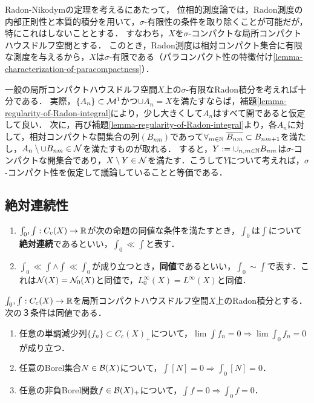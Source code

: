 \documentclass[uplatex,dvipdfmx]{jsreport}
\begin{document}
\begin{tcolorbox}[colframe=ForestGreen, colback=ForestGreen!10!white,breakable,colbacktitle=ForestGreen!40!white,coltitle=black,fonttitle=\bfseries\sffamily,
title=]
    Radon-Nikodymの定理を考えるにあたって，
    位相的測度論では，Radon測度の内部正則性と本質的積分を用いて，$\sigma$-有限性の条件を取り除くことが可能だが，特にこれはしないこととする．
    すなわち，$X$を$\sigma$-コンパクトな局所コンパクトハウスドルフ空間とする．
    このとき，Radon測度は相対コンパクト集合に有限な測度を与えるから，$X$は$\sigma$-有限である（パラコンパクト性の特徴付け\ref{lemma-characterization-of-paracompactness}）．
\end{tcolorbox}

\begin{remark}
    一般の局所コンパクトハウスドルフ空間$X$上の$\sigma$-有限なRadon積分を考えれば十分である．
    実際，$\{A_n\}\subset\mathcal{M}^1$かつ$\cup A_n=X$を満たすならば，補題\ref{lemma-regularity-of-Radon-integral}により，少し大きくして$A_n$はすべて開であると仮定して良い．
    次に，再び補題\ref{lemma-regularity-of-Radon-integral}より，各$A_n$に対して，相対コンパクトな開集合の列$(B_{nm})$であって$\forall_{m\in\mathbb{N}}\;\overline{B_{nm}}\subset B_{nm+1}$を満たし，$A_n\setminus\cup B_{nm}\in\mathcal{N}$を満たすものが取れる．
    すると，$Y:=\cup_{n,m\in\mathbb{N}}B_{nm}$は$\sigma$-コンパクトな開集合であり，$X\setminus Y\in\mathcal{N}$を満たす．こうして$Y$について考えれば，$\sigma$-コンパクト性を仮定して議論していることと等価である．
\end{remark}

\subsection{絶対連続性}

\begin{definition}\mbox{}
    \begin{enumerate}
        \item $\int_0,\int:C_c(X)\to\mathbb{R}$が次の命題の同値な条件を満たすとき，$\int_0$は$\int$について\textbf{絶対連続}であるといい，$\int_0\ll\int$と表す．
        \item $\int_0\ll\int\land\int\ll\int_0$が成り立つとき，\textbf{同値}であるといい，$\int_0\sim\int$で表す．これは$\mathcal{N}(X)=\mathcal{N}_0(X)$と同値で，$L^\infty_0(X)=L^\infty(X)$と同値．
    \end{enumerate}
\end{definition}

\begin{proposition}
    $\int_0,\int:C_c(X)\to\mathbb{R}$を局所コンパクトハウスドルフ空間$X$上のRadon積分とする．次の３条件は同値である．
    \begin{enumerate}
        \item 任意の単調減少列$\{f_n\}\subset C_c(X)_+$について，$\lim\int f_n=0\Rightarrow\lim\int_0f_n=0$が成り立つ．
        \item 任意のBorel集合$N\in\mathcal{B}(X)$について，$\int[N]=0\Rightarrow\int_0[N]=0$．
        \item 任意の非負Borel関数$f\in\mathcal{B}(X)_+$について，$\int f=0\Rightarrow\int_0f=0$．
    \end{enumerate}
\end{proposition}
\end{document}
